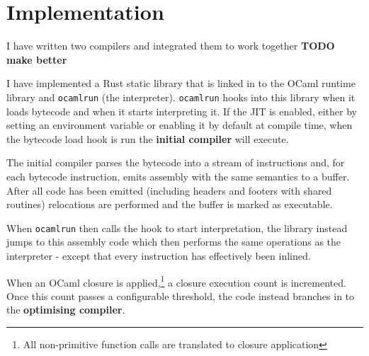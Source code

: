 
\newcommand{\codeat}[1]{\normalfont{\small Code at \texttt{#1}}}

\newcommand{\codesection}[2]{
      \section[#1]{#1\\\codeat{#2}}
}
\newcommand{\codesubsection}[2]{
      \subsection[#1]{#1\\\codeat{#2}}
}
\newcommand{\codesubsubsection}[2]{
      \subsubsection[#1]{#1\\\codeat{#2}}
}

\chapter{Implementation}



I have written two compilers and integrated them to work together \textbf{TODO make better}

I have implemented a Rust static library that is linked in to the OCaml runtime library and
\texttt{ocamlrun} (the interpreter).
\texttt{ocamlrun} hooks into this library when it loads bytecode and when it starts
interpreting it.
If the JIT is enabled, either by setting an environment variable or enabling it by default at
compile time,
when the bytecode load hook is run the \textbf{initial compiler} will execute.

The initial compiler parses the bytecode into a stream of instructions and, for each bytecode
instruction,
emits assembly with the same semantics to a buffer. After all code has been emitted (including
headers
and footers with shared routines) relocations are performed and the buffer is marked as executable.

When \texttt{ocamlrun} then calls the hook to start interpretation, the library instead jumps to
this assembly code which then performs the same operations as the interpreter - except that every
instruction has effectively been inlined.

When an OCaml closure is applied,\footnote{All non-primitive function calls are translated to
      closure application}
a closure execution count is incremented. Once this count passes a configurable threshold, the code
instead
branches in to the \textbf{optimising compiler}.

